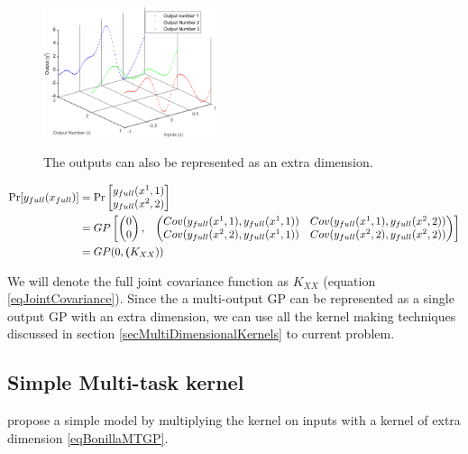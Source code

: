 \begin{figure}[!ht]
  \centering
        \includegraphics[width=0.45\textwidth]
        {images/part3/outputsAsAnExtraDimension}
        \label{figoutputsAsAnExtraDimension}
        \caption{The outputs can also be represented as an extra dimension.}
\end{figure}

\begin{equation}\label{eq:mogpJointPrior}
\begin{aligned}
       \Pr[y_{full}(x_{full})] & = \Pr\begin{bmatrix}   y_{full}(x^{1}, 1) \\ y_{full}(x^{2}, 2)   \end{bmatrix} \\
& = GP\begin{bmatrix}
   \begin{pmatrix}
   0\\ 
   0
   \end{pmatrix} ,& 
   \begin{pmatrix}
    Cov(y_{full}(x^{1}, 1), y_{full}(x^{1}, 1))  & Cov(y_{full}(x^{1}, 1), y_{full}(x^{2}, 2))\\ 
    Cov(y_{full}(x^{2}, 2), y_{full}(x^{1}, 1))     & Cov(y_{full}(x^{2}, 2), y_{full}(x^{2}, 2))
   \end{pmatrix}
   \end{bmatrix} \\
       & = GP(0, \bm{\mathit{(}}K_{XX}))
\end{aligned}
   \end{equation}

We will denote the full joint covariance function as $K_{XX}$ (equation \ref{eqJointCovariance}). Since the a multi-output GP can be represented as a single output GP with an extra dimension, we can use all the kernel making techniques discussed in section \ref{secMultiDimensionalKernels} to current problem. 

\subsection{Simple Multi-task kernel}\label{simpleMultiTask}
\cite{bonilla2007multi} propose a simple model by multiplying the kernel on inputs with a kernel of extra dimension \ref{eqBonillaMTGP}.

